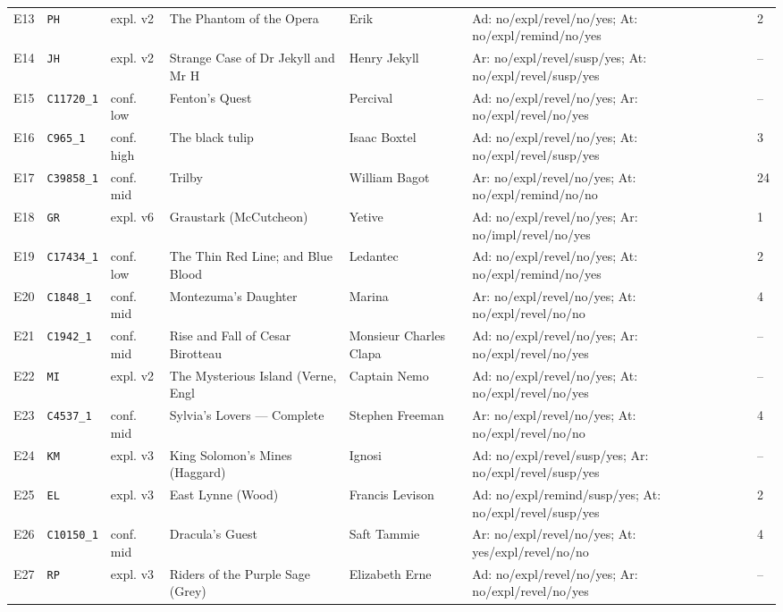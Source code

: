 \documentclass[11pt]{article}
\begin{document}
{\begin{longtable}{p{0.6cm}p{1.4cm}p{1.1cm}p{3.1cm}p{2.0cm}p{4.6cm}p{0.8cm}}
E13 & \texttt{PH} & expl. v2 & The Phantom of the Opera & Erik & Ad: no/expl/revel/no/yes; At: no/expl/remind/no/yes & 2 \\
E14 & \texttt{JH} & expl. v2 & Strange Case of Dr Jekyll and Mr H & Henry Jekyll & Ar: no/expl/revel/susp/yes; At: no/expl/revel/susp/yes & -- \\
E15 & \texttt{C11720\_1} & conf. low & Fenton's Quest & Percival & Ad: no/expl/revel/no/yes; Ar: no/expl/revel/no/yes & -- \\
E16 & \texttt{C965\_1} & conf. high & The black tulip & Isaac Boxtel & Ad: no/expl/revel/no/yes; At: no/expl/revel/susp/yes & 3 \\
E17 & \texttt{C39858\_1} & conf. mid & Trilby & William Bagot & Ar: no/expl/revel/no/yes; At: no/expl/remind/no/no & 24 \\
E18 & \texttt{GR} & expl. v6 & Graustark (McCutcheon) & Yetive & Ad: no/expl/revel/no/yes; Ar: no/impl/revel/no/yes & 1 \\
E19 & \texttt{C17434\_1} & conf. low & The Thin Red Line; and Blue Blood & Ledantec & Ad: no/expl/revel/no/yes; At: no/expl/remind/no/yes & 2 \\
E20 & \texttt{C1848\_1} & conf. mid & Montezuma's Daughter & Marina & Ar: no/expl/revel/no/yes; At: no/expl/revel/no/no & 4 \\
E21 & \texttt{C1942\_1} & conf. mid & Rise and Fall of Cesar Birotteau & Monsieur Charles Clapa & Ad: no/expl/revel/no/yes; Ar: no/expl/revel/no/yes & -- \\
E22 & \texttt{MI} & expl. v2 & The Mysterious Island (Verne, Engl & Captain Nemo & Ad: no/expl/revel/no/yes; At: no/expl/revel/no/yes & -- \\
E23 & \texttt{C4537\_1} & conf. mid & Sylvia's Lovers — Complete & Stephen Freeman & Ar: no/expl/revel/no/yes; At: no/expl/revel/no/no & 4 \\
E24 & \texttt{KM} & expl. v3 & King Solomon's Mines (Haggard) & Ignosi & Ad: no/expl/revel/susp/yes; Ar: no/expl/revel/susp/yes & -- \\
E25 & \texttt{EL} & expl. v3 & East Lynne (Wood) & Francis Levison & Ad: no/expl/remind/susp/yes; At: no/expl/revel/susp/yes & 2 \\
E26 & \texttt{C10150\_1} & conf. mid & Dracula's Guest & Saft Tammie & Ar: no/expl/revel/no/yes; At: yes/expl/revel/no/no & 4 \\
E27 & \texttt{RP} & expl. v3 & Riders of the Purple Sage (Grey) & Elizabeth Erne & Ad: no/expl/revel/no/yes; Ar: no/expl/revel/no/yes & -- \\

\end{longtable}}
\end{document}

